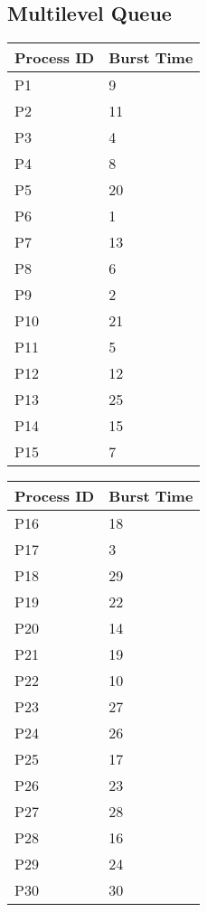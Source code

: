 \documentclass{article}
\begin{document}
\subsection{Multilevel Queue}
\vspace{\baselineskip}
\hspace{1cm}
\begin{minipage}[t]{0.3\textwidth}
    \begin{tabularx}{\textwidth}{|l|X|}
    \hline
    \rowcolor{darkblue}
    \textbf{Process ID} & \textbf{Burst Time}\\
    \hline
    \rowcolor{lightblue}
    P1 & 9 \\
    P2 & 11 \\
    \rowcolor{lightblue}
    P3 & 4 \\
    P4 & 8 \\
    \rowcolor{lightblue}
    P5 & 20 \\
    P6 & 1 \\
    \rowcolor{lightblue}
    P7 & 13 \\
    P8 & 6 \\
    \rowcolor{lightblue}
    P9 & 2 \\
    P10 & 21 \\
    \rowcolor{lightblue}
    P11 & 5 \\
    P12 & 12 \\
    \rowcolor{lightblue}
    P13 & 25 \\
    P14 & 15 \\
    \rowcolor{lightblue}
    P15 & 7 \\
    \hline
    \end{tabularx}
\end{minipage}
\hspace{2cm}
\begin{minipage}[t!]{0.3\textwidth}
    \begin{tabularx}{\textwidth}{|l|X|}
\hline
    \rowcolor{darkblue}
    \textbf{Process ID} & \textbf{Burst Time}\\
    \hline
    \rowcolor{lightblue}
    P16 & 18 \\
    P17 & 3 \\
    \rowcolor{lightblue}
    P18 & 29 \\
    P19 & 22 \\
    \rowcolor{lightblue}
    P20 & 14 \\
    P21 & 19 \\
    \rowcolor{lightblue}
    P22 & 10 \\
    P23 & 27 \\
    \rowcolor{lightblue}
    P24 & 26 \\
    P25 & 17 \\
    \rowcolor{lightblue}
    P26 & 23 \\
    P27 & 28 \\
    \rowcolor{lightblue}
    P28 & 16 \\
    P29 & 24 \\
    \rowcolor{lightblue}
    P30 & 30 \\
    \hline
    \end{tabularx}
\end{minipage}
\bigskip
\end{document}
